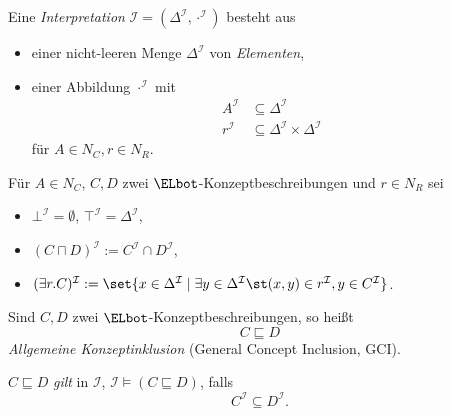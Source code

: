 \documentclass[ngerman]{beamer}
\begin{document}
\begin{frame}

  \onslide<+->
  \onslide<+->

  \begin{Definition}
    Eine \emph{Interpretation} $\mathcal{I} = (\Delta^{\mathcal{I}}, \cdot^{\mathcal{I}})$
    besteht aus
    \begin{itemize}
    \item<+-> einer nicht-leeren Menge $\Delta^{\mathcal{I}}$ von \emph{Elementen},
    \item<+-> einer Abbildung $\cdot^{\mathcal{I}}$ mit
      \begin{align*}
        A^{\mathcal{I}} &\subseteq \Delta^{\mathcal{I}} \\
        r^{\mathcal{I}} &\subseteq \Delta^{\mathcal{I}} \times \Delta^{\mathcal{I}}
      \end{align*}
      für $A \in N_{C}, r \in N_{R}$.
    \end{itemize}
  \end{Definition}

  \onslide<+->

  \begin{Definition}
    Für $A \in N_C$, $C, D$ zwei $\ELbot$-Konzeptbeschreibungen und $r \in N_R$ sei
    \begin{itemize}
    \item $\bot^{\mathcal{I}} = \emptyset$, $\top^{\mathcal{I}} = \Delta^{\mathcal{I}}$,
    \item $(C \sqcap D)^{\mathcal{I}} := C^{\mathcal{I}} \cap D^{\mathcal{I}}$,
    \item $(\exists r. C)^{\mathcal{I}} := \set{ x \in \Delta^{\mathcal{I}} \mid \exists y
        \in \Delta^{\mathcal{I}} \st (x, y) \in r^{\mathcal{I}}, y \in C^{\mathcal{I}} }$.
    \end{itemize}
  \end{Definition}

\end{frame}

\begin{frame}

  \onslide<+->

  \begin{Definition}
    Sind $C, D$ zwei $\ELbot$-Konzeptbeschreibungen, so heißt
    \begin{equation*}
      C \sqsubseteq D
    \end{equation*}
    \emph{Allgemeine Konzeptinklusion} (General Concept Inclusion, GCI).

    \onslide<+->%
    \medskip{}%
    $C \sqsubseteq D$ \emph{gilt} in $\mathcal{I}$, $\mathcal{I} \models (C \sqsubseteq
    D)$, falls
    \begin{equation*}
      C^{\mathcal{I}} \subseteq D^{\mathcal{I}}.
    \end{equation*}
  \end{Definition}

\end{frame}
\end{document}
